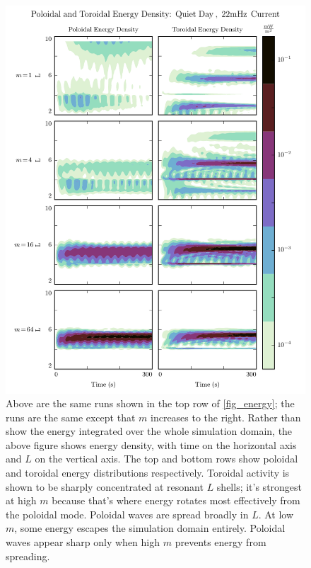 \documentclass{article}
\newcommand{\azm}{\ensuremath{m}\xspace}
\begin{document}
\begin{figure}
    \label{fig_layers_day}
    \begin{center}
    \includegraphics[width=\textwidth]{figures/fig_layers_day.pdf}
    \caption{
        Above are the same runs shown in the top row of \cref{fig_energy}; the runs are the same except that \azm increases to the right. Rather than show the energy integrated over the whole simulation domain, the above figure shows energy density, with time on the horizontal axis and $L$ on the vertical axis. The top and bottom rows show poloidal and toroidal energy distributions respectively. Toroidal activity is shown to be sharply concentrated at resonant $L$ shells; it's strongest at high \azm because that's where energy rotates most effectively from the poloidal mode. Poloidal waves are spread broadly in $L$. At low \azm, some energy escapes the simulation domain entirely. Poloidal waves appear sharp only when high \azm prevents energy from spreading. 
    }
    \end{center}
\end{figure}
\end{document}
